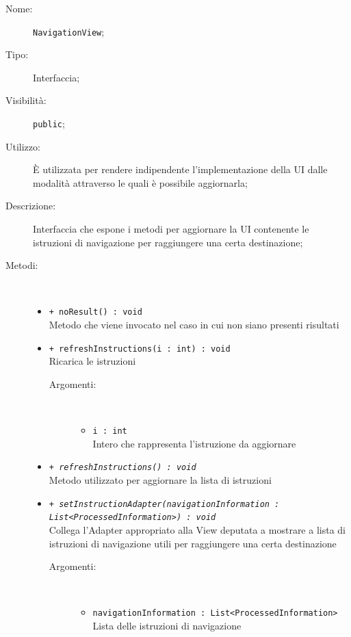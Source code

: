 \documentclass[../DefinizioneDiProdotto.tex]{subfiles}
\begin{document}
\begin{description}
	\item[Nome:] \texttt{NavigationView};
	\item[Tipo:] Interfaccia;
	\item[Visibilità:] \texttt{public};
	\item[Utilizzo:] È utilizzata per rendere indipendente l'implementazione della UI dalle modalità attraverso le quali è possibile aggiornarla;
	\item[Descrizione:] Interfaccia che espone i metodi per aggiornare la UI contenente le istruzioni di navigazione per raggiungere una certa destinazione;
	\item[Metodi:] \
	\begin{itemize}
		\item \texttt{+ noResult() : void}\\
		Metodo che viene invocato nel caso in cui non siano presenti risultati
		\item \texttt{+ refreshInstructions(i : int) : void}\\
		Ricarica le istruzioni
		\begin{description}
			\item[Argomenti:] \
			\begin{itemize}
				\item \texttt{i : int}\\
				Intero che rappresenta l'istruzione da aggiornare\end{itemize}
		\end{description}
		\item \texttt{+ \textit{refreshInstructions() : void}}\\
		Metodo utilizzato per aggiornare la lista di istruzioni 
		\item \texttt{+ \textit{setInstructionAdapter(navigationInformation : List<ProcessedInformation>) : void}}\\
		Collega l'Adapter appropriato alla View deputata a mostrare a lista di istruzioni di navigazione utili per raggiungere una certa destinazione
		\begin{description}
			\item[Argomenti:] \
			\begin{itemize}
				\item \texttt{navigationInformation : List<ProcessedInformation>}\\
				Lista delle istruzioni di navigazione\end{itemize}
		\end{description}

\end{itemize}
\end{description}
\end{document}
